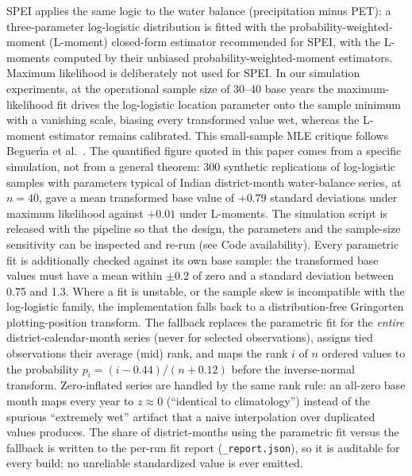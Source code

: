 \documentclass[10pt,a4paper]{article}
\begin{document}
SPEI applies the same logic to the water balance (precipitation minus PET): a three-parameter log-logistic distribution is fitted with the probability-weighted-moment (L-moment) closed-form estimator recommended for SPEI\citep{VicenteSerrano2010,Begueria2014}, with the L-moments computed by their unbiased probability-weighted-moment estimators\citep{Hosking1990}. Maximum likelihood is deliberately not used for SPEI. In our simulation experiments, at the operational sample size of 30--40 base years the maximum-likelihood fit drives the log-logistic location parameter onto the sample minimum with a vanishing scale, biasing every transformed value wet, whereas the L-moment estimator remains calibrated. This small-sample MLE critique follows Beguer\'{\i}a et al.~\citeyearpar{Begueria2014}. The quantified figure quoted in this paper comes from a specific simulation, not from a general theorem: 300 synthetic replications of log-logistic samples with parameters typical of Indian district-month water-balance series, at $n=40$, gave a mean transformed base value of $+0.79$ standard deviations under maximum likelihood against $+0.01$ under L-moments. The simulation script is released with the pipeline so that the design, the parameters and the sample-size sensitivity can be inspected and re-run (see Code availability). Every parametric fit is additionally checked against its own base sample: the transformed base values must have a mean within $\pm0.2$ of zero and a standard deviation between 0.75 and 1.3. Where a fit is unstable, or the sample skew is incompatible with the log-logistic family, the implementation falls back to a distribution-free Gringorten plotting-position transform\citep{Gringorten1963}. The fallback replaces the parametric fit for the \emph{entire} district-calendar-month series (never for selected observations), assigns tied observations their average (mid) rank, and maps the rank $i$ of $n$ ordered values to the probability $p_i=(i-0.44)/(n+0.12)$ before the inverse-normal transform. Zero-inflated series are handled by the same rank rule: an all-zero base month maps every year to $z\approx0$ (``identical to climatology'') instead of the spurious ``extremely wet'' artifact that a naive interpolation over duplicated values produces. The share of district-months using the parametric fit versus the fallback is written to the per-run fit report (\texttt{\_report.json}), so it is auditable for every build; no unreliable standardized value is ever emitted.
\end{document}
